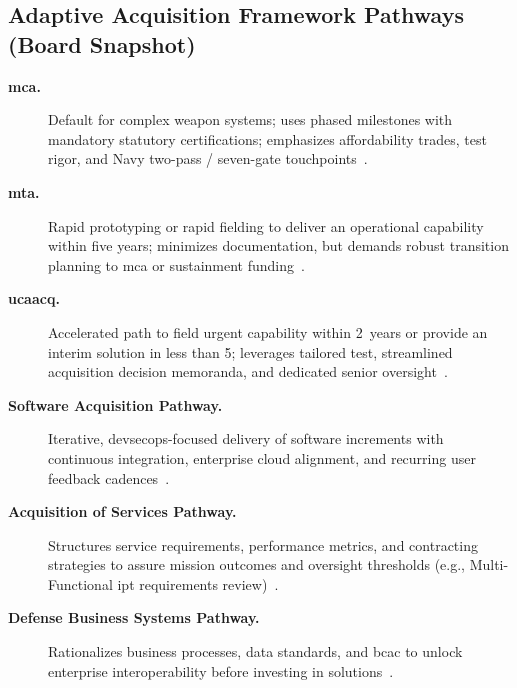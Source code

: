\documentclass[../main.tex]{subfiles}
\begin{document}
\subsection{Adaptive Acquisition Framework Pathways (Board Snapshot)}
\begin{description}
  \item[\textbf{\ac{mca}.}] Default for complex weapon systems; uses phased milestones with mandatory statutory certifications; emphasizes affordability trades, test rigor, and Navy two-pass / seven-gate touchpoints~\autocite{DoDI5000-85}.
  \item[\textbf{\ac{mta}.}] Rapid prototyping or rapid fielding to deliver an operational capability within five years; minimizes documentation, but demands robust transition planning to \ac{mca} or sustainment funding~\autocite{DoDI5000-80}.
  \item[\textbf{\ac{ucaacq}.}] Accelerated path to field urgent capability within 2~years or provide an interim solution in less than 5; leverages tailored test, streamlined acquisition decision memoranda, and dedicated senior oversight~\autocite{DoDI5000-81}.
  \item[\textbf{Software Acquisition Pathway.}] Iterative, \ac{devsecops}-focused delivery of software increments with continuous integration, enterprise cloud alignment, and recurring user feedback cadences~\autocite{DoDI5000-87}.
  \item[\textbf{Acquisition of Services Pathway.}] Structures service requirements, performance metrics, and contracting strategies to assure mission outcomes and oversight thresholds (e.g., Multi-Functional \ac{ipt} requirements review)~\autocite{DoDI5000-74}.
  \item[\textbf{Defense Business Systems Pathway.}] Rationalizes business processes, data standards, and \ac{bcac} to unlock enterprise interoperability before investing in solutions~\autocite{DoDI5000-75}.
\end{description}
\end{document}
